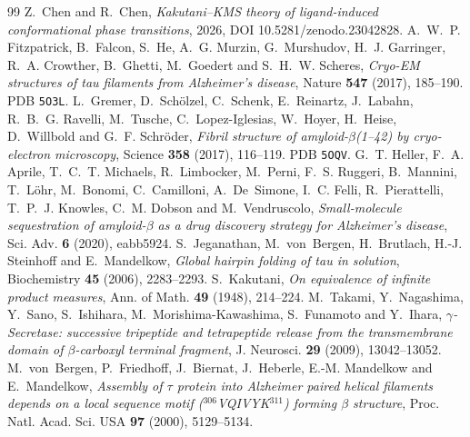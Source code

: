 \documentclass[11pt,reqno]{amsart}
\theoremstyle{plain}
\theoremstyle{definition}
\theoremstyle{remark}
\numberwithin{equation}{section}
\begin{document}
\begin{thebibliography}{99}
 Z.~Chen and R.~Chen, \emph{Kakutani--KMS theory of ligand-induced conformational phase transitions}, 2026, DOI 10.5281/zenodo.23042828.
 A.~W.~P. Fitzpatrick, B.~Falcon, S.~He, A.~G. Murzin, G.~Murshudov, H.~J. Garringer, R.~A. Crowther, B.~Ghetti, M.~Goedert and S.~H.~W. Scheres, \emph{Cryo-EM structures of tau filaments from Alzheimer's disease}, Nature \textbf{547} (2017), 185--190. PDB \texttt{5O3L}.
 L.~Gremer, D.~Sch\"olzel, C.~Schenk, E.~Reinartz, J.~Labahn, R.~B.~G. Ravelli, M.~Tusche, C.~Lopez-Iglesias, W.~Hoyer, H.~Heise, D.~Willbold and G.~F. Schr\"oder, \emph{Fibril structure of amyloid-$\beta$(1--42) by cryo-electron microscopy}, Science \textbf{358} (2017), 116--119. PDB \texttt{5OQV}.
 G.~T. Heller, F.~A. Aprile, T.~C.~T. Michaels, R.~Limbocker, M.~Perni, F.~S. Ruggeri, B.~Mannini, T.~L\"ohr, M.~Bonomi, C.~Camilloni, A.~De~Simone, I.~C. Felli, R.~Pierattelli, T.~P.~J. Knowles, C.~M. Dobson and M.~Vendruscolo, \emph{Small-molecule sequestration of amyloid-$\beta$ as a drug discovery strategy for Alzheimer's disease}, Sci. Adv. \textbf{6} (2020), eabb5924.
 S.~Jeganathan, M.~von~Bergen, H.~Brutlach, H.-J. Steinhoff and E.~Mandelkow, \emph{Global hairpin folding of tau in solution}, Biochemistry \textbf{45} (2006), 2283--2293.
 S.~Kakutani, \emph{On equivalence of infinite product measures}, Ann. of Math. \textbf{49} (1948), 214--224.
 M.~Takami, Y.~Nagashima, Y.~Sano, S.~Ishihara, M.~Morishima-Kawashima, S.~Funamoto and Y.~Ihara, \emph{$\gamma$-Secretase: successive tripeptide and tetrapeptide release from the transmembrane domain of $\beta$-carboxyl terminal fragment}, J. Neurosci. \textbf{29} (2009), 13042--13052.
 M.~von~Bergen, P.~Friedhoff, J.~Biernat, J.~Heberle, E.-M. Mandelkow and E.~Mandelkow, \emph{Assembly of $\tau$ protein into Alzheimer paired helical filaments depends on a local sequence motif ($^{306}$VQIVYK$^{311}$) forming $\beta$ structure}, Proc. Natl. Acad. Sci. USA \textbf{97} (2000), 5129--5134.
\end{thebibliography}
\end{document}
